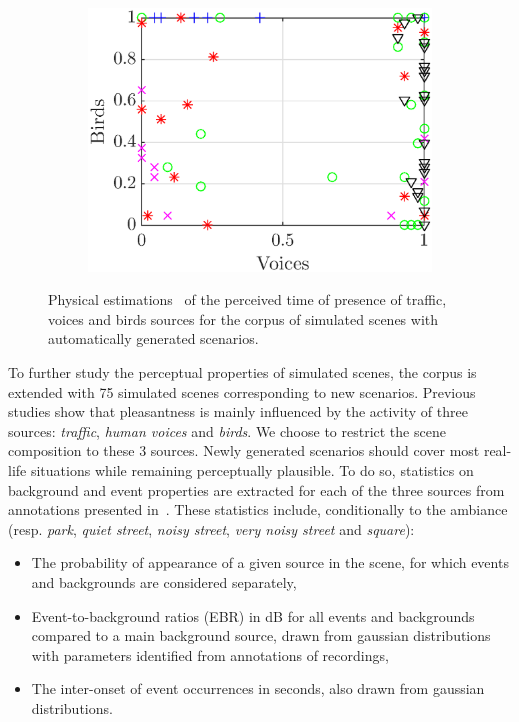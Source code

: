 \documentclass[twocolumn]{article}
\begin{document}
\begin{figure}[th]
\begin{subfigure}[t]{0.33\textwidth}
        \includegraphics[width=\textwidth]{figures/vb_pres.eps}
    \end{subfigure}
    \caption{Physical estimations~\cite{gontier2018} of the perceived time of presence of traffic, voices and birds sources for the corpus of simulated scenes with automatically generated scenarios.}\label{fig:tvb_pres}
\end{figure}

To further study the perceptual properties of simulated scenes, the corpus is extended with 75 simulated scenes corresponding to new scenarios. Previous studies show that pleasantness is mainly influenced by the activity of three sources: \textit{traffic}, \textit{human voices} and \textit{birds}. We choose to restrict the scene composition to these 3 sources. Newly generated scenarios should cover most real-life situations while remaining perceptually plausible. To do so, statistics on background and event properties are extracted for each of the three sources from annotations presented in~\cite{gloaguen2017}. These statistics include, conditionally to the ambiance (resp. \textit{park}, \textit{quiet street}, \textit{noisy street}, \textit{very noisy street} and \textit{square}):

\begin{itemize}
\item The probability of appearance of a given source in the scene, for which events and backgrounds are considered separately,
\item Event-to-background ratios (EBR) in dB for all events and backgrounds compared to a main background source, drawn from gaussian distributions with parameters identified from annotations of recordings,
\item The inter-onset of event occurrences in seconds, also drawn from gaussian distributions.
\end{itemize}
\end{document}
